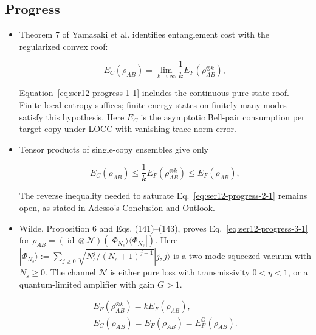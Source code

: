 \subsection*{Progress}

\begin{itemize}
  \item Theorem 7 of Yamasaki et al. identifies entanglement cost with the regularized convex roof:

\begin{equation}
E_C(\rho_{AB})=\lim_{k\to\infty}\frac1kE_F(\rho_{AB}^{\otimes k}),
\label{eq:ser12-progress-1-1}
\end{equation}

Equation~\eqref{eq:ser12-progress-1-1} includes the continuous pure-state roof. Finite local entropy suffices; finite-energy states on finitely many modes satisfy this hypothesis. Here $E_C$ is the asymptotic Bell-pair consumption per target copy under LOCC with vanishing trace-norm error. 

  \item Tensor products of single-copy ensembles give only

\begin{equation}
E_C(\rho_{AB})\leq\frac1kE_F(\rho_{AB}^{\otimes k})\leq E_F(\rho_{AB}),
\label{eq:ser12-progress-2-1}
\end{equation}

The reverse inequality needed to saturate Eq.~\eqref{eq:ser12-progress-2-1} remains open, as stated in Adesso's Conclusion and Outlook. 

  \item Wilde, Proposition 6 and Eqs. (141)--(143), proves Eq.~\eqref{eq:ser12-progress-3-1} for $\rho_{AB}=(\operatorname{id}\otimes\mathcal N)(|\Phi_{N_s}\rangle\langle\Phi_{N_s}|)$. Here $|\Phi_{N_s}\rangle:=\sum_{j\geq0}\sqrt{N_s^j/(N_s+1)^{j+1}}|j,j\rangle$ is a two-mode squeezed vacuum with $N_s\geq0$. The channel $\mathcal N$ is either pure loss with transmissivity $0<\eta<1$, or a quantum-limited amplifier with gain $G>1$.

\begin{equation}
\begin{gathered}
E_F(\rho_{AB}^{\otimes k})=kE_F(\rho_{AB}),\\
E_C(\rho_{AB})=E_F(\rho_{AB})=E_F^{\mathrm G}(\rho_{AB}).
\end{gathered}
\label{eq:ser12-progress-3-1}
\end{equation}


\end{itemize}
